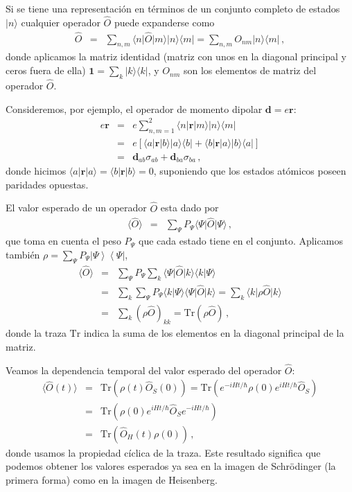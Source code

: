 \documentclass[12pt]{report}
\newcommand{\mbd}{\mathbf{d}}
\newcommand{\mbr}{\mathbf{r}}
\newcommand{\Tr}{\mathrm{Tr}}
\providecommand{\vxp}[1]{\langle #1 \rangle}
\providecommand{\bra}[1]{\langle #1 \rvert}
\providecommand{\ket}[1]{\lvert #1 \rangle}
\providecommand{\braket}[2]{\langle #1 \rvert #2 \rangle}
\newcommand{\ketbra}[2]{\left| {#1} \right\rangle\left\langle {#2}\right|}
\begin{document}
Si se tiene una representaci\'on en t\'erminos de un conjunto completo de 
estados $\ket{n}$ cualquier operador $\hat{O}$ puede expanderse como 
%
\begin{eqnarray}
\hat{O} &=& \sum_{n,m} \bra{n} \hat{O} \ket{m} \ket{n} \bra{m}  
	= \sum_{n,m} O_{nm} \ket{n} \bra{m} \,,
\end{eqnarray}
donde aplicamos la matriz identidad (matriz con unos en la diagonal 
principal y ceros fuera de ella) $\mathbf{1} =\sum_k \ket{k} \bra{k}$, y 
$O_{nm}$ son los elementos de matriz del operador $\hat{O}$. 

Consideremos, por ejemplo, el operador de momento dipolar 
$\mbd= e \mbr$: 
%
\begin{eqnarray}
e\mbr &=& e \sum_{n,m=1}^2 \bra{n} \mbr \ket{m} \ket{n} \bra{m}  
	\nonumber \\
	&=& e \left[ \bra{a} \mbr \ket{b} \ket{a} \bra{b} 
		+\bra{b} \mbr \ket{a} \ket{b} \bra{a}  \right] 		\nonumber \\
	&=& \mbd_{ab} \sigma_{ab} +\mbd_{ba} \sigma_{ba} \,,
\end{eqnarray}
donde hicimos $\bra{a} \mbr \ket{a} = \bra{b} \mbr \ket{b} =0$, suponiendo 
que los estados at\'omicos poseen paridades opuestas. 

El valor esperado de un operador $\hat{O}$ esta dado por  
%
\begin{eqnarray}
\vxp{\hat{O}} &=& \sum_{\Psi} P_{\Psi} \bra{\Psi} \hat{O}\ket{\Psi}  \,,
\end{eqnarray}
que toma en cuenta el peso $P_{\Psi}$ que cada estado tiene en el conjunto. 
Aplicamos tambi\'en  
$\rho = \sum_{\Psi} P_{\Psi} \ketbra{\Psi}{\Psi}$, 
%
\begin{eqnarray}
\vxp{\hat{O}} &=&  \sum_{\Psi} P_{\Psi} \sum_k \bra{\Psi} \hat{O}\ket{k}
		\braket{k}{\Psi} 	\nonumber \\ 
&=& \sum_k \sum_{\Psi} P_{\Psi} \braket{k}{\Psi}  \bra{\Psi} \hat{O}\ket{k} 
	= \sum_k \bra{k} \rho \hat{O} \ket{k} 	\nonumber  \\ 
&=& \sum_k ( \rho \hat{O} )_{kk} 	= \Tr ( \rho \hat{O} ) \,,
\end{eqnarray}
donde la traza $\Tr$ indica la suma de los elementos en la diagonal principal 
de la matriz. 

Veamos la dependencia temporal del valor esperado del operador 
$\hat{O}$: 
%
\begin{eqnarray}
\vxp{\hat{O}(t)} &=& \Tr ( \rho(t) \hat{O}_S(0) ) 	
	=  \Tr ( e^{-iHt/\hbar} \rho(0)  e^{iHt/\hbar} \hat{O}_S ) \nonumber \\ 
	&=& \Tr (  \rho(0)  e^{iHt/\hbar} \hat{O}_S e^{-iHt/\hbar} ) \nonumber \\
	&=& \Tr ( \hat{O}_H(t) \rho(0) ) \,, 
\end{eqnarray}
donde usamos la propiedad c\'iclica de la traza. Este resultado significa 
que podemos obtener los valores esperados ya sea en la imagen de 
Schr\"odinger (la primera forma) como en la imagen de Heisenberg.
\end{document}
